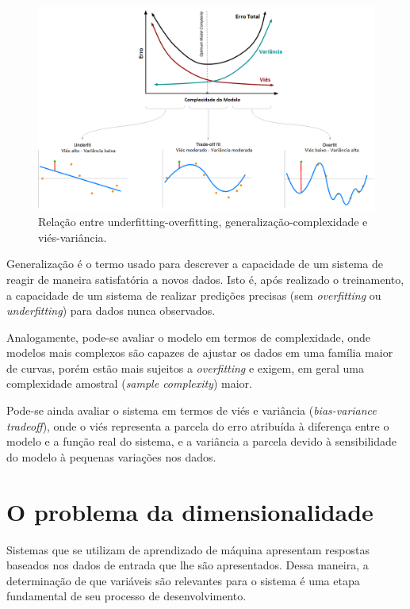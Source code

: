 \begin{figure}[H]
    \caption{Relação entre underfitting-overfitting, generalização-complexidade e viés-variância.}
    \begin{center}
    \includegraphics[width=\linewidth]{imgs/intro/over_underfitting}
    \end{center}
    \label{fig:over_underfitting}
\end{figure}

Generalização é o termo usado para descrever a capacidade de um sistema de reagir de maneira satisfatória a novos dados. Isto é, após realizado o treinamento, a capacidade de um sistema de realizar predições precisas (sem \textit{overfitting} ou \textit{underfitting}) para dados nunca observados.

Analogamente, pode-se avaliar o modelo em termos de complexidade, onde modelos mais complexos são capazes de ajustar os dados em uma família maior de curvas, porém estão mais sujeitos a \textit{overfitting} e exigem, em geral uma complexidade amostral (\textit{sample complexity}) maior.

Pode-se ainda avaliar o sistema em termos de viés e variância (\textit{bias-variance tradeoff}), onde o viés representa a parcela do erro atribuída à diferença entre o modelo e a função real do sistema, e a variância a parcela devido à sensibilidade do modelo à pequenas variações nos dados.

\section{O problema da dimensionalidade}

Sistemas que se utilizam de aprendizado de máquina apresentam respostas baseados nos dados de entrada que lhe são apresentados. Dessa maneira, a determinação de que variáveis são relevantes para o sistema é uma etapa fundamental de seu processo de desenvolvimento.

